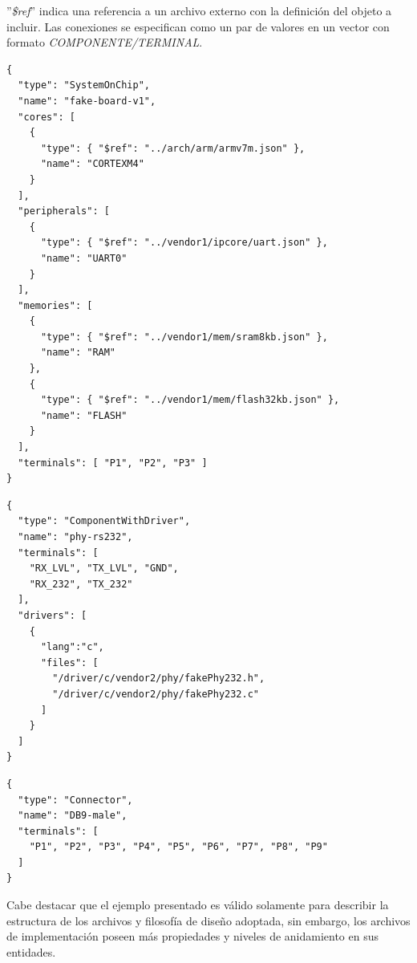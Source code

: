 ''\emph{\$ref}'' indica una referencia a un archivo externo con la definición del objeto a incluir. Las conexiones se especifican como un par de valores en un vector con formato \emph{COMPONENTE/TERMINAL}.


\begin{lstlisting}[caption=Archivo de descripción de \emph{SoC} nombrado \emph{fakeSoc.json}]
{
  "type": "SystemOnChip",
  "name": "fake-board-v1",
  "cores": [
    {
      "type": { "$ref": "../arch/arm/armv7m.json" },
      "name": "CORTEXM4"
    }
  ],
  "peripherals": [
    {
      "type": { "$ref": "../vendor1/ipcore/uart.json" },
      "name": "UART0"
    }
  ],
  "memories": [
    {
      "type": { "$ref": "../vendor1/mem/sram8kb.json" },
      "name": "RAM"
    },
    {
      "type": { "$ref": "../vendor1/mem/flash32kb.json" },
      "name": "FLASH"
    }
  ],
  "terminals": [ "P1", "P2", "P3" ]
}
\end{lstlisting}


\begin{lstlisting}[caption=Archivo de descripción de un chip de capa física para RS-232  nombrado \emph{fakePhy232.json}]
{
  "type": "ComponentWithDriver",
  "name": "phy-rs232",
  "terminals": [ 
    "RX_LVL", "TX_LVL", "GND",
    "RX_232", "TX_232"
  ],
  "drivers": [
    {
      "lang":"c",
      "files": [
        "/driver/c/vendor2/phy/fakePhy232.h",
        "/driver/c/vendor2/phy/fakePhy232.c"      
      ]      
    }
  ]
}
\end{lstlisting}


\begin{lstlisting}[caption=Archivo de descripción de un conector \emph{DB-9} nombrado \emph{fakeDb9Male.json}]
{
  "type": "Connector",
  "name": "DB9-male",
  "terminals": [ 
    "P1", "P2", "P3", "P4", "P5", "P6", "P7", "P8", "P9"
  ]
}
\end{lstlisting}

Cabe destacar que el ejemplo presentado es válido solamente para describir la estructura de los archivos y filosofía de diseño adoptada, sin embargo, los archivos de implementación poseen más propiedades y niveles de anidamiento en sus entidades.
